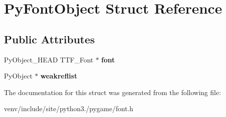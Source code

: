\hypertarget{struct_py_font_object}{}\section{Py\+Font\+Object Struct Reference}
\label{struct_py_font_object}
\subsection*{Public Attributes}
\begin{DoxyCompactItemize}
\item 
\mbox{\label{struct_py_font_object_aa1a9ceab75d3105938f7bc2d4ac574e5}} 
Py\+Object\+\_\+\+H\+E\+AD T\+T\+F\+\_\+\+Font $\ast$ {\bfseries font}
\item 
\mbox{\label{struct_py_font_object_ae7e2bf718c030b855390eb7de940f051}} 
Py\+Object $\ast$ {\bfseries weakreflist}
\end{DoxyCompactItemize}


The documentation for this struct was generated from the following file\+:\begin{DoxyCompactItemize}
\item 
venv/include/site/python3./pygame/font.\+h\end{DoxyCompactItemize}
